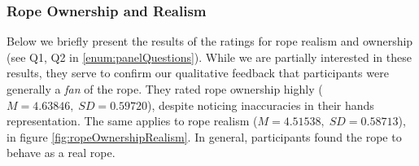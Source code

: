 \subsubsection{Rope Ownership and Realism}
\label{subsubsection:ropeOwnRealism}

Below we briefly present the results of the ratings for rope realism and ownership (see Q1, Q2 in \ref{enum:panelQuestions}). While we are partially interested in these results, they serve to confirm our qualitative feedback that participants were generally a \textit{fan} of the rope. They rated rope ownership highly 
($M=4.63846, \; SD=0.59720$), despite noticing inaccuracies in their hands representation. The same applies to rope realism ($M=4.51538, \; SD=0.58713$), in figure \ref{fig:ropeOwnershipRealism}. In general, participants found the rope to behave as a real rope.

